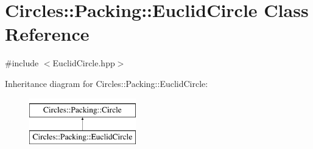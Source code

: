 \hypertarget{class_circles_1_1_packing_1_1_euclid_circle}{}\section{Circles\+:\+:Packing\+:\+:Euclid\+Circle Class Reference}
\label{class_circles_1_1_packing_1_1_euclid_circle}


{\ttfamily \#include $<$Euclid\+Circle.\+hpp$>$}

Inheritance diagram for Circles\+:\+:Packing\+:\+:Euclid\+Circle\+:\begin{figure}[H]
\begin{center}
\leavevmode
\includegraphics[height=2.000000cm]{class_circles_1_1_packing_1_1_euclid_circle}
\end{center}
\end{figure}
